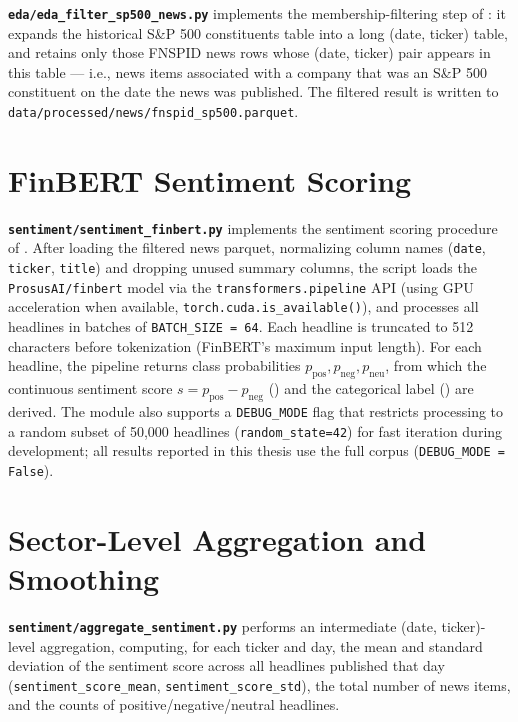 \textbf{\texttt{eda/eda\_filter\_sp500\_news.py}} implements the
membership-filtering step of : it expands the
historical S\&P 500 constituents table into a long (date, ticker) table,
and retains only those FNSPID news rows whose (date, ticker) pair appears
in this table --- i.e., news items associated with a company that was an
S\&P 500 constituent on the date the news was published. The filtered
result is written to \texttt{data/processed/news/fnspid\_sp500.parquet}.

\section{FinBERT Sentiment Scoring}
\label{annex:pipeline-finbert}

\textbf{\texttt{sentiment/sentiment\_finbert.py}} implements the sentiment
scoring procedure of . After loading the filtered
news parquet, normalizing column names (\texttt{date}, \texttt{ticker},
\texttt{title}) and dropping unused summary columns, the script loads the
\texttt{ProsusAI/finbert} model via the \texttt{transformers.pipeline} API
(using GPU acceleration when available, \texttt{torch.cuda.is\_available()}),
and processes all headlines in batches of \texttt{BATCH\_SIZE = 64}. Each
headline is truncated to 512 characters before tokenization (FinBERT's
maximum input length). For each headline, the pipeline returns class
probabilities $p_{\text{pos}}, p_{\text{neg}}, p_{\text{neu}}$, from which
the continuous sentiment score $s = p_{\text{pos}} - p_{\text{neg}}$
() and the categorical label
() are derived. The module also supports a
\texttt{DEBUG\_MODE} flag that restricts processing to a random subset of
50,000 headlines (\texttt{random\_state=42}) for fast iteration during
development; all results reported in this thesis use the full corpus
(\texttt{DEBUG\_MODE = False}).

\section{Sector-Level Aggregation and Smoothing}
\label{annex:pipeline-aggregation}

\textbf{\texttt{sentiment/aggregate\_sentiment.py}} performs an
intermediate (date, ticker)-level aggregation, computing, for each
ticker and day, the mean and standard deviation of the sentiment score
across all headlines published that day (\texttt{sentiment\_score\_mean},
\texttt{sentiment\_score\_std}), the total number of news items, and the
counts of positive/negative/neutral headlines.

